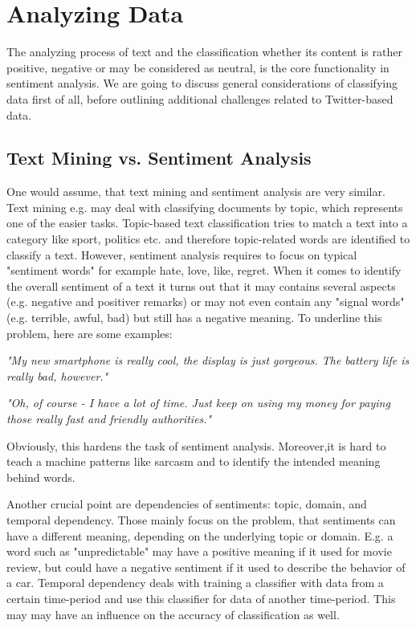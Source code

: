 \documentclass{acm_proc_article-sp}
\begin{document}
\section{Analyzing Data} \label{analyzingdata}
The analyzing process of text and the classification whether its content is rather positive, negative or may be considered as neutral, is the core functionality in sentiment analysis. We are going to discuss general considerations of classifying data first of all, before outlining additional challenges related to Twitter-based data.

\subsection{Text Mining vs. Sentiment Analysis}
One would assume, that text mining and sentiment analysis are very similar. Text mining e.g. may deal with classifying documents by topic, which represents one of the easier tasks. Topic-based text classification tries to match a text into a category like sport, politics etc. and therefore topic-related words are identified to classify a text. However, sentiment analysis requires to focus on typical "sentiment words" for example hate, love, like, regret.
When it comes to identify the overall sentiment of a text it turns out that it may contains several aspects (e.g. negative and positiver remarks) or may not even contain any "signal words" (e.g. terrible, awful, bad) but still has a negative meaning.
To underline this problem, here are some examples:

\textit{"My new smartphone is really cool, the display is just gorgeous. The battery life is really bad, however."}

\textsl{"Oh, of course - I have a lot of time. Just keep on using my money for paying those really fast and friendly authorities."}

Obviously, this hardens the task of sentiment analysis. Moreover,it is hard to teach a machine patterns like sarcasm and to identify the intended meaning behind words.
\cite{liu2010sentimentanalysis,pang2008opinion}


Another crucial point are dependencies of sentiments: topic, domain, and temporal dependency. Those mainly focus on the problem, that sentiments can have a different meaning, depending on the underlying topic or domain. E.g. a word such as "unpredictable" may have a positive meaning if it used for movie review, but could have a negative sentiment if it used to describe the behavior of a car. Temporal dependency deals with training a classifier with data from a certain time-period and use this classifier for data of another time-period. This may may have an influence on the accuracy of classification as well. \cite{read2005using}
\end{document}
